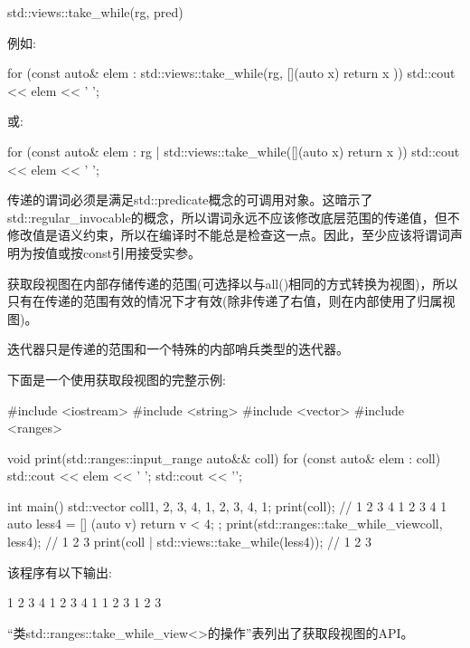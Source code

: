 \begin{cpp}
std::views::take_while(rg, pred)
\end{cpp}

例如:

\begin{cpp}
for (const auto& elem : std::views::take_while(rg, [](auto x) {
						return x %
					})) {
	std::cout << elem << ' ';
}
\end{cpp}

或:

\begin{cpp}
for (const auto& elem : rg | std::views::take_while([](auto x) {
						return x %
					})) {
	std::cout << elem << ' ';
}
\end{cpp}

传递的谓词必须是满足std::predicate概念的可调用对象。这暗示了std::regular\_invocable的概念，所以谓词永远不应该修改底层范围的传递值，但不修改值是语义约束，所以在编译时不能总是检查这一点。因此，至少应该将谓词声明为按值或按const引用接受实参。

获取段视图在内部存储传递的范围(可选择以与all()相同的方式转换为视图)，所以只有在传递的范围有效的情况下才有效(除非传递了右值，则在内部使用了归属视图)。

迭代器只是传递的范围和一个特殊的内部哨兵类型的迭代器。

下面是一个使用获取段视图的完整示例:


\begin{cpp}
#include <iostream>
#include <string>
#include <vector>
#include <ranges>

void print(std::ranges::input_range auto&& coll)
{
	for (const auto& elem : coll) {
		std::cout << elem << ' ';
	}
	std::cout << '\n';
}

int main()
{
	std::vector coll{1, 2, 3, 4, 1, 2, 3, 4, 1};
	print(coll); // 1 2 3 4 1 2 3 4 1
	auto less4 = [] (auto v) { return v < 4; };
	print(std::ranges::take_while_view{coll, less4}); // 1 2 3
	print(coll | std::views::take_while(less4)); // 1 2 3
}
\end{cpp}

该程序有以下输出:

\begin{shell}
1 2 3 4 1 2 3 4 1
1 2 3
1 2 3
\end{shell}


“类std::ranges::take\_while\_view<>的操作”表列出了获取段视图的API。

